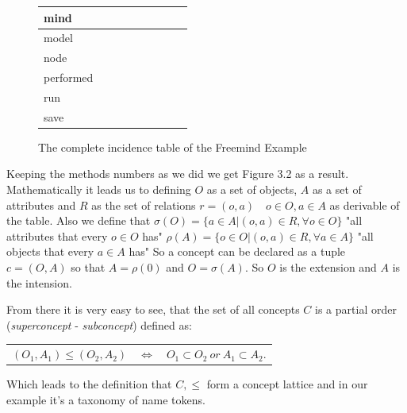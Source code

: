 \begin{figure}
\begin{tabular}{| l | c | c | c | c | c | c | c | c |}
      mind 		& \checkmark	& \checkmark & \checkmark  & \checkmark & \checkmark & \checkmark  & \checkmark & \checkmark \\ \hline
      model 		& \checkmark	& \checkmark & \checkmark  & \checkmark & \checkmark & \checkmark  & \checkmark & \checkmark \\ \hline
      node 		&			    	&                    &                     &                    &                    & \checkmark  & \checkmark &                     \\ \hline
      performed 	&			    	&                    &                     &                    &                    &                     &                    & \checkmark  \\ \hline
      run 			& \checkmark 	&                    &                     &                    &                    &                     &                    &                     \\ \hline
      save 		& \checkmark	& \checkmark & \checkmark  &			     & \checkmark & \checkmark  & \checkmark &				 \\ \hline
    \end{tabular}
     \caption{The complete incidence table of the Freemind Example}
     \label{FCA_finaltable}
\end{figure}

Keeping the methods numbers  as we did we get Figure 3.2 as a result. Mathematically it leads us to defining $O$ as a set of objects, $A$ as a set of attributes and $R$ as the set of relations $r = (o,a) \quad o\in O,a\in A$ as derivable of the table. Also we define that \newline
$\sigma(O) = \{a \in A | (o,a) \in R, \forall o \in O \}$  \quad "all attributes that every $o\in O$ has" \newline
 $\rho(A)= \{o\in O|(o,a)\in R, \forall a\in A \}$  \quad "all objects that every $a\in A$ has" \newline
So a concept can be declared as a tuple $c=(O,A)$ so that $A=\rho(0)$ and $O=\sigma(A)$. So $O$ is the extension and $A$ is the intension.

From there it is very easy to see, that the set of all concepts $C$ is a partial order (\emph{superconcept} - \emph{subconcept}) defined as: \newline
\begin{center}
  \vspace{-2em}
  \begin{tabular}{ r c l }
  $ (O_1,A_1) \le (O_2, A_2)$ & $\Leftrightarrow$ & $O_1 \subset O_2 \ or \ A_1 \subset A_2$. \\
  \end{tabular}
\end{center}
\vspace{-1em}
Which leads to the definition that $C, \le$ form a concept lattice and in our example it's a taxonomy of name tokens.

